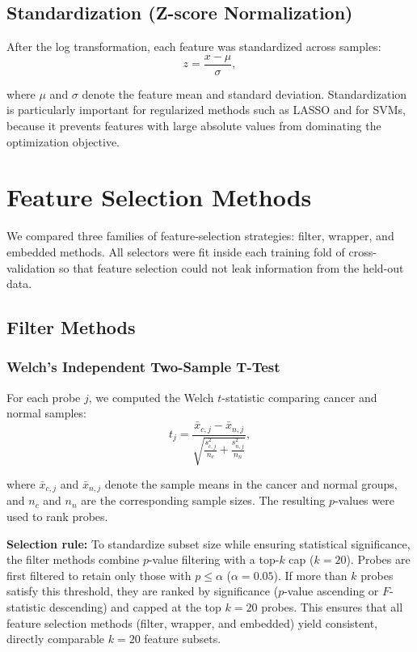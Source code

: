 \subsection{Standardization (Z-score Normalization)}

After the log transformation, each feature was standardized across samples:
\begin{equation}
    z = \frac{x - \mu}{\sigma},
\end{equation}

where $\mu$ and $\sigma$ denote the feature mean and standard deviation. Standardization is particularly important for regularized methods such as LASSO and for SVMs, because it prevents features with large absolute values from dominating the optimization objective.

\section{Feature Selection Methods}

We compared three families of feature-selection strategies: filter, wrapper, and embedded methods. All selectors were fit inside each training fold of cross-validation so that feature selection could not leak information from the held-out data.

\subsection{Filter Methods}

\subsubsection{Welch's Independent Two-Sample T-Test}

For each probe $j$, we computed the Welch $t$-statistic comparing cancer and normal samples:
\begin{equation}
    t_j = \frac{\bar{x}_{c,j} - \bar{x}_{n,j}}{\sqrt{\frac{s_{c,j}^2}{n_c} + \frac{s_{n,j}^2}{n_n}}},
\end{equation}

where $\bar{x}_{c,j}$ and $\bar{x}_{n,j}$ denote the sample means in the cancer and normal groups, and $n_c$ and $n_n$ are the corresponding sample sizes. The resulting $p$-values were used to rank probes.

\textbf{Selection rule:} To standardize subset size while ensuring statistical significance, the filter methods combine $p$-value filtering with a top-$k$ cap ($k=20$). Probes are first filtered to retain only those with $p \leq \alpha$ ($\alpha = 0.05$). If more than $k$ probes satisfy this threshold, they are ranked by significance ($p$-value ascending or $F$-statistic descending) and capped at the top $k=20$ probes. This ensures that all feature selection methods (filter, wrapper, and embedded) yield consistent, directly comparable $k=20$ feature subsets.

